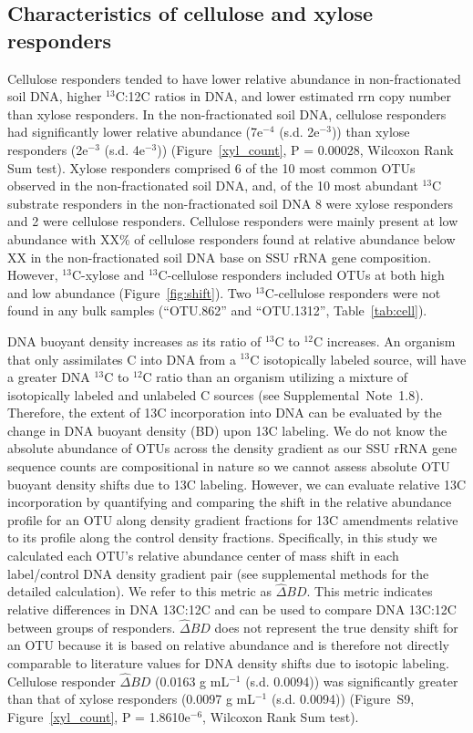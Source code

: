 \subsection{Characteristics of cellulose and xylose responders}
Cellulose responders tended to have lower relative abundance in
non-fractionated soil DNA, higher $^{13}$C:12C ratios in DNA, and lower estimated
rrn copy number than xylose responders. In the non-fractionated soil DNA,
cellulose responders had significantly lower relative abundance (7e$^{-4}$
(s.d. 2e$^{-3}$)) than xylose responders (2e$^{-3}$ (s.d. 4e$^{-3}$))
(Figure~\ref{xyl_count}, P = 0.00028, Wilcoxon Rank Sum test). Xylose
responders comprised 6 of the 10 most common OTUs observed in the
non-fractionated soil DNA, and, of the 10 most abundant $^{13}$C substrate
responders in the non-fractionated soil DNA
8 were xylose responders and 2 were cellulose responders. Cellulose responders
were mainly present at low abundance with XX\% of cellulose responders found at
relative abundance below XX in the non-fractionated soil DNA base on SSU rRNA
gene composition. However, $^{13}$C-xylose and $^{13}$C-cellulose responders
included OTUs at both high and low abundance (Figure~\ref{fig:shift}). Two
$^{13}$C-cellulose responders were not found in any bulk samples (``OTU.862''
and ``OTU.1312'', Table~\ref{tab:cell}).

DNA buoyant density increases as its ratio of $^{13}$C to $^{12}$C increases.
An organism that only assimilates C into DNA from a $^{13}$C isotopically
labeled source, will have a greater DNA $^{13}$C to $^{12}$C ratio 
than an organism utilizing a mixture of isotopically labeled and unlabeled
C sources (see Supplemental~Note~1.8). Therefore, the extent of 13C
incorporation into DNA can be evaluated by the change in DNA buoyant density
(BD) upon 13C labeling. We do not know the absolute abundance of OTUs across
the density gradient as our SSU rRNA gene sequence counts are compositional in
nature so we cannot assess absolute OTU buoyant density shifts due to 13C
labeling. However, we can evaluate relative 13C incorporation by quantifying
and comparing the shift in the relative abundance profile for an OTU along
density gradient fractions for 13C amendments relative to its profile along the
control density fractions. Specifically, in this study we calculated each OTU's
relative abundance center of mass shift in each label/control DNA density
gradient pair (see supplemental methods for the detailed calculation). We refer
to this metric as $\hat{\Delta}BD$. This metric indicates relative differences
in DNA 13C:12C and can be used to compare DNA 13C:12C between groups of
responders. $\hat{\Delta}BD$ does not represent the true density shift for an
OTU because it is based on relative abundance and is therefore not directly
comparable to literature values for DNA density shifts due to isotopic
labeling. Cellulose responder $\hat{\Delta}BD$ (0.0163 g mL$^{-1}$ (s.d.
0.0094)) was significantly greater than that of xylose responders (0.0097
g mL$^{-1}$ (s.d. 0.0094)) (Figure S9, Figure~\ref{xyl_count},
P = 1.8610e$^{-6}$, Wilcoxon Rank Sum test). 


